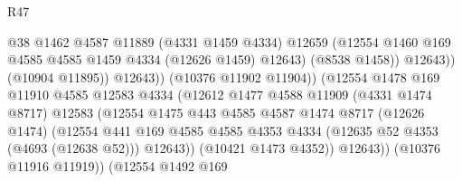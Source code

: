 \begin{lexlean}{R47}
\begin{coremodule}
                                            @38
                                            @1462
                                            @4587
                                            @11889
                                            (@4331 @1459 @4334)
                                            @12659
                                            (@12554
                                              @1460
                                              @169
                                              @4585
                                              @4585
                                              @1459
                                              @4334
                                              (@12626 @1459)
                                              @12643)
                                            (@8538 @1458))
                                          @12643))
                                      (@10904 @11895))
                                    @12643))
                                (@10376 @11902 @11904))
                              (@12554
                                @1478
                                @169
                                @11910
                                @4585
                                @12583
                                @4334
                                (@12612
                                  @1477
                                  @4588
                                  @11909
                                  (@4331 @1474 @8717)
                                  @12583
                                  (@12554
                                    @1475
                                    @443
                                    @4585
                                    @4587
                                    @1474
                                    @8717
                                    (@12626 @1474)
                                    (@12554
                                      @441
                                      @169
                                      @4585
                                      @4585
                                      @4353
                                      @4334
                                      (@12635 @52 @4353 (@4693 (@12638 @52)))
                                      @12643))
                                  (@10421 @1473 @4352))
                                @12643))
                            (@10376 @11916 @11919))
                          (@12554
                            @1492
                            @169

\end{coremodule}
\end{lexlean}
